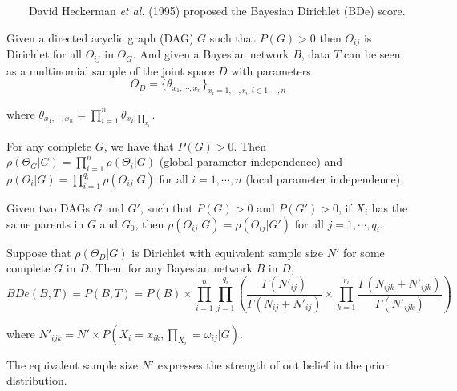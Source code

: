 ~~~~David Heckerman \emph{et al.} (1995) proposed the Bayesian Dirichlet (BDe) score.

Given a directed acyclic graph (DAG) $G$ such that $P(G)>0$ then $\varTheta_{ij}$ is Dirichlet for all $\varTheta_{ij}$ in $\varTheta_{G}$. And given a Bayesian network $B$, data $T$ can be seen as a multinomial sample of the joint space $D$ with parameters
$$\Theta_{D}=\{\theta_{x_{1},\cdots,x_{n}}\}_{x_{i}=1,\cdots,r_{i},i\in1,\cdots,n}$$

where $\theta_{x_{1}, \cdots, x_{n}} = \prod_{i=1}^{n}\theta_{x_{I}|\prod_{x_{i}}}$.

For any complete $G$, we have that $P(G) > 0$. Then $\rho(\varTheta_{G}|G)=\prod_{i=1}^{n}\rho(\varTheta_{i}|G)$ (global parameter independence) and $\rho(\varTheta_{i}|G)=\prod_{i=1}^{q_{i}}\rho(\varTheta_{ij}|G)$ for all $i=1,\cdots,n$ (local parameter independence).

Given two DAGs $G$ and $G'$, such that $P(G)>0$ and $P(G')>0$, if $X_{i}$ has the same parents in $G$ and $G_{0}$, then $\rho(\varTheta_{ij}|G)=\rho(\varTheta_{ij}|G')$ for all $j=1,\cdots,q_{i}$.

Suppose that $\rho(\Theta_{D}|G)$ is Dirichlet with equivalent sample size $N'$ for some complete $G$ in $D$. Then, for any Bayesian network $B$ in $D$,
$$BDe(B,T) = P(B,T)=P(B)\times\prod_{i=1}^{n}\prod_{j=1}^{q_{i}}(\frac{\Gamma(N'_{ij})}{\Gamma(N_{ij}+N'_{ij})}\times\prod_{k=1}^{r_{i}}\frac{\Gamma(N_{ijk}+N'_{ijk})}{\Gamma(N'_{ijk})})$$

where $N'_{ijk} = N' \times P(X_{i} = x_{ik}, \prod_{X_{i}} = \omega_{ij}|G)$.

The equivalent sample size $N'$ expresses the strength of out belief in the prior distribution.
